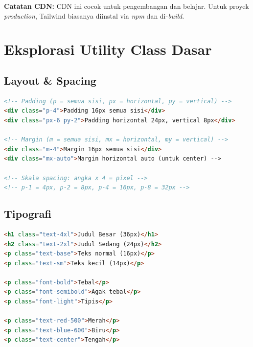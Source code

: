 \begin{catatan}
\textbf{Catatan CDN:} CDN ini cocok untuk pengembangan dan belajar. Untuk proyek \emph{production}, Tailwind biasanya diinstal via \emph{npm} dan di-\emph{build}.
\end{catatan}

\section{Eksplorasi Utility Class Dasar}
\label{sec:12-utility}

\subsection{Layout \& Spacing}

\begin{lstlisting}[language=HTML, caption={Utility class untuk spacing}, label={lst:12-spacing}]
<!-- Padding (p = semua sisi, px = horizontal, py = vertical) -->
<div class="p-4">Padding 16px semua sisi</div>
<div class="px-6 py-2">Padding horizontal 24px, vertical 8px</div>

<!-- Margin (m = semua sisi, mx = horizontal, my = vertical) -->
<div class="m-4">Margin 16px semua sisi</div>
<div class="mx-auto">Margin horizontal auto (untuk center) -->

<!-- Skala spacing: angka x 4 = pixel -->
<!-- p-1 = 4px, p-2 = 8px, p-4 = 16px, p-8 = 32px -->
\end{lstlisting}

\subsection{Tipografi}

\begin{lstlisting}[language=HTML, caption={Utility class untuk tipografi}, label={lst:12-tipografi}]
<h1 class="text-4xl">Judul Besar (36px)</h1>
<h2 class="text-2xl">Judul Sedang (24px)</h2>
<p class="text-base">Teks normal (16px)</p>
<p class="text-sm">Teks kecil (14px)</p>

<p class="font-bold">Tebal</p>
<p class="font-semibold">Agak tebal</p>
<p class="font-light">Tipis</p>

<p class="text-red-500">Merah</p>
<p class="text-blue-600">Biru</p>
<p class="text-center">Tengah</p>
\end{lstlisting}

